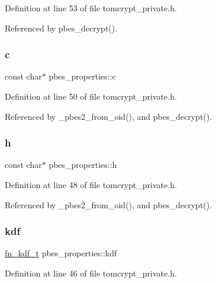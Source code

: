 Definition at line 53 of file tomcrypt\+\_\+private.\+h.



Referenced by pbes\+\_\+decrypt().

\mbox{\label{structpbes__properties_a821664389b9d7c6de99aeb7593beb48c}} 
\subsubsection{\texorpdfstring{c}{c}}
{\footnotesize\ttfamily const char$\ast$ pbes\+\_\+properties\+::c}



Definition at line 50 of file tomcrypt\+\_\+private.\+h.



Referenced by \+\_\+pbes2\+\_\+from\+\_\+oid(), and pbes\+\_\+decrypt().

\mbox{\label{structpbes__properties_ae2a9b6e73cee94acd3d082641c2b6ea8}} 
\subsubsection{\texorpdfstring{h}{h}}
{\footnotesize\ttfamily const char$\ast$ pbes\+\_\+properties\+::h}



Definition at line 48 of file tomcrypt\+\_\+private.\+h.



Referenced by \+\_\+pbes2\+\_\+from\+\_\+oid(), and pbes\+\_\+decrypt().

\mbox{\label{structpbes__properties_a6edc1f4ee556a89b6812d0be927b1547}} 
\subsubsection{\texorpdfstring{kdf}{kdf}}
{\footnotesize\ttfamily \mbox{\hyperlink{tomcrypt__private_8h_a056acfa9f8dfc66d7ebbe1315389f3b2}{fn\+\_\+kdf\+\_\+t}} pbes\+\_\+properties\+::kdf}



Definition at line 46 of file tomcrypt\+\_\+private.\+h.



